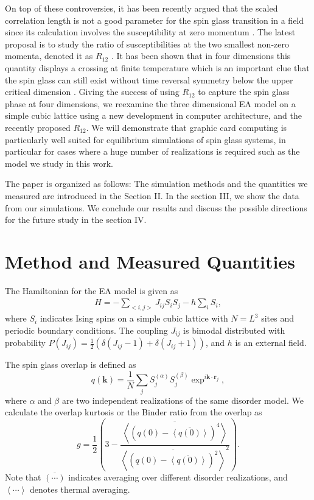 \documentclass[aps,prb,twocolumn,showpacs,superscriptaddress]{revtex4}
\renewcommand{\vec}[1]{\mathbf{#1}}
\begin{document}
On top of these controversies, it has been recently argued that the scaled correlation length 
is not a good parameter for the spin glass transition in a field since its calculation involves 
the susceptibility at zero momentum \cite{Leuzzi-etal-2008}.
The latest proposal is to study the ratio of susceptibilities at the 
two smallest non-zero momenta, denoted it as $R_{12}$ \cite{Banos-2012}. It has 
been shown that in four dimensions this quantity displays a crossing
at finite temperature which is an important clue that the spin glass can still 
exist without time reversal symmetry below the upper critical dimension \cite{Banos-2012}. 
Giving the success of using $R_{12}$ to capture the spin glass phase
at four dimensions, we reexamine the three dimensional EA model on a simple cubic lattice using 
a new development in computer architecture, and the recently proposed $R_{12}$. 
We will demonstrate that graphic card computing is particularly well suited for 
equilibrium simulations of spin glass systems, in particular for cases where a huge number 
of realizations is required such as the model we study in this work. 

The paper is organized as follows: The simulation methods and the quantities we measured 
are introduced in the Section II. In the section III, we show the data from our simulations.
We conclude our results and discuss the possible directions for the future study in the
section IV.


\section{Method and Measured Quantities} 
The Hamiltonian for the EA model is given as
\begin{eqnarray}
H=-\sum_{<i,j>} J_{ij} S_{i}S_{j}-h\sum_{i}S_{i},
\label{Hamiltonian}
\end{eqnarray}
where $S_i$ indicates Ising spins on a simple cubic lattice with $N=L^3$ sites and periodic boundary conditions. 
The coupling $J_{ij}$ is bimodal distributed with probability %
$P(J_{ij}) = \frac{1}{2}(\delta(J_{ij}-1) + \delta(J_{ij}+1))$, and $h$ is an external field.

The spin glass overlap is defined as 
\begin{equation}
  \label{eq:overlap}
  q(\vec{k})=\frac{1}{N}\sum_{j}S_j^{(\alpha)} S_j^{(\beta)}\exp^{i\vec{k} \cdot \vec{r}_j},
\end{equation}
where $\alpha$ and $\beta$ are two independent realizations of the same disorder model.
We calculate the overlap kurtosis or the Binder ratio from the overlap as \cite{Ciria-etal-1993,Marinari-etal-1998}
\begin{equation}
  \label{eq:binder}
  g=\frac{1}{2}\left(3-\frac{\overline{\left<\left(q(0)-\overline{\left<q(0)\right>}\right)^4\right>}}{\overline{\left<\left(q(0)-\overline{\left<q(0)\right>}\right)^2\right>}^2}\right).
\end{equation}
Note that $\overline{(\cdots)}$ indicates averaging over different disorder realizations,
and $\left<\cdots\right>$ denotes thermal averaging.
\end{document}
